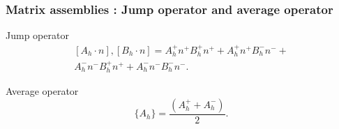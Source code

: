 \documentclass{beamer}
\begin{document}
\begin{frame}
\frametitle{Matrix assemblies : Jump operator and average operator}

\begin{block}{Jump operator}
\begin{equation} \label{Jump operator L2}
\begin{split}
[A_h \cdot n],[B_h \cdot n] = A_h^+ n^+ B_h^+ n^+ + A_h^+ n^+ B_h^- n^- + \\ A_h^- n^- B_h^+ n^+ + A_h^- n^- B_h^- n^- \textrm{.}
\end{split}
\end{equation}
\end{block}

\begin{block}{Average operator}
\begin{equation}\label{Average operator}
\lbrace A_h \rbrace = \frac{(A_h^+ + A_h^-)}{2} \textrm{.}
\end{equation}
\end{block}

\end{frame}
\end{document}
